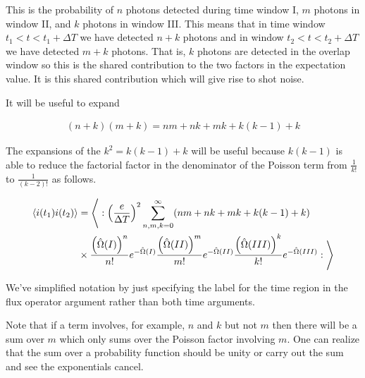 \documentclass[12pt]{article}
\begin{document}
This is the probability of $n$ photons detected during time window I, $m$ photons in window II, and $k$ photons in window III. This means that in time window $t_1<t<t_1+\Delta T$ we have detected $n+k$ photons and in window $t_2<t<t_2+\Delta T$ we have detected $m+k$ photons. That is, $k$ photons are detected in the overlap window so this is the shared contribution to the two factors in the expectation value. It is this shared contribution which will give rise to shot noise.

It will be useful to expand

\begin{align}
(n+k)(m+k) = nm + nk + mk + k(k-1) + k
\end{align}

The expansions of the $k^2 = k(k-1) + k$ will be useful because $k(k-1)$ is able to reduce the factorial factor in the denominator of the Poisson term from $\frac{1}{k!}$ to $\frac{1}{(k-2)!}$ as follows.

\begin{align}
\Braket{i(t_1)i(t_2)} &= \Bigg \langle: \left(\frac{e}{\Delta T}\right)^2 \sum_{n,m,k=0}^{\infty} (nm + nk + mk + k(k-1) + k)\\
&\times \frac{\left(\hat{\Omega}(I)\right)^n}{n!}e^{-\hat{\Omega}(I)} \frac{\left(\hat{\Omega}(II)\right)^m}{m!}e^{-\hat{\Omega}(II)} \frac{\left(\hat{\Omega}(III)\right)^k}{k!}e^{-\hat{\Omega}(III)} :\Bigg \rangle\\
\end{align}

We've simplified notation by just specifying the label for the time region in the flux operator argument rather than both time arguments.

Note that if a term involves, for example, $n$ and $k$ but not $m$ then there will be a sum over $m$ which only sums over the Poisson factor involving $m$. One can realize that the sum over a probability function should be unity or carry out the sum and see the exponentials cancel.
\end{document}
